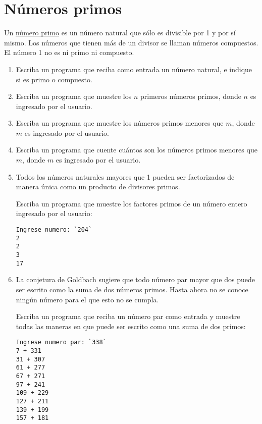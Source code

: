 \section{Números primos}
\label{sec:primos}

Un \href{http://es.wikipedia.org/wiki/N\%C3\%BAmero\_primo}{número
primo} es un número natural que sólo es divisible por 1 y por sí mismo.
Los números que tienen más de un divisor se llaman números compuestos.
El número 1 no es ni primo ni compuesto.

\begin{enumerate}

\item
  Escriba un programa que reciba como entrada un número natural, e
  indique si es primo o compuesto.

\item
  Escriba un programa que muestre los \(n\) primeros números primos, donde
  \(n\) es ingresado por el usuario.

\item
  Escriba un programa que muestre los números primos menores que \(m\),
  donde \(m\) es ingresado por el usuario.

\item
  Escriba un programa que cuente cuántos son los números primos menores
  que \(m\), donde \(m\) es ingresado por el usuario.

\item
  Todos los números naturales mayores que 1 pueden ser factorizados de
  manera única como un producto de divisores primos.

  Escriba un programa que muestre los factores primos de un número
  entero ingresado por el usuario:

\begin{lstlisting}[language=testcase]
Ingrese numero: `204`
2
2
3
17
\end{lstlisting}

\item
  La conjetura de Goldbach sugiere que todo número par mayor que dos
  puede ser escrito como la suma de dos números primos. Hasta ahora no
  se conoce ningún número para el que esto no se cumpla.

  Escriba un programa que reciba un número par como entrada y muestre
  todas las maneras en que puede ser escrito como una suma de dos
  primos:
\begin{lstlisting}[language=testcase]
Ingrese numero par: `338`
7 + 331
31 + 307
61 + 277
67 + 271
97 + 241
109 + 229
127 + 211
139 + 199
157 + 181
\end{lstlisting}


\end{enumerate}
